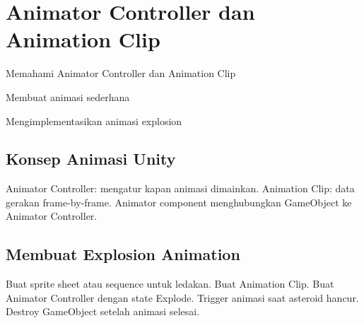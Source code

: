 \section{Animator Controller dan Animation Clip}

\begin{learningoutcomes}
\item Memahami Animator Controller dan Animation Clip
\item Membuat animasi sederhana
\item Mengimplementasikan animasi explosion
\end{learningoutcomes}

\subsection{Konsep Animasi Unity}

Animator Controller: mengatur kapan animasi dimainkan. Animation Clip: data gerakan frame-by-frame. Animator component menghubungkan GameObject ke Animator Controller.

\subsection{Membuat Explosion Animation}

Buat sprite sheet atau sequence untuk ledakan. Buat Animation Clip. Buat Animator Controller dengan state Explode. Trigger animasi saat asteroid hancur. Destroy GameObject setelah animasi selesai.
